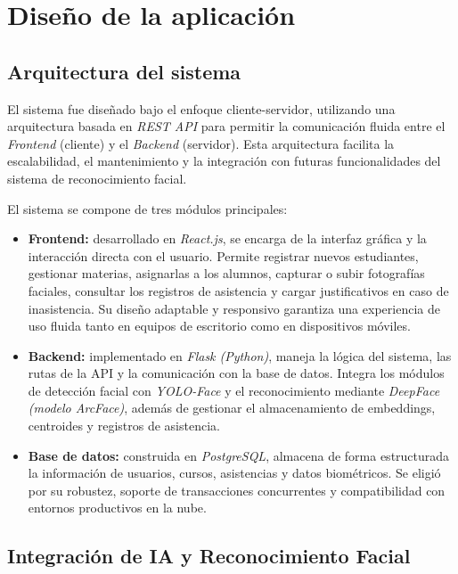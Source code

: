 \section{Diseño de la aplicación}
\subsection{Arquitectura del sistema}

El sistema fue diseñado bajo el enfoque cliente-servidor, utilizando una arquitectura basada en \textit{REST API} para permitir la comunicación fluida entre el \textit{Frontend} (cliente) y el \textit{Backend} (servidor).  
Esta arquitectura facilita la escalabilidad, el mantenimiento y la integración con futuras funcionalidades del sistema de reconocimiento facial.

El sistema se compone de tres módulos principales:

\begin{itemize}
    \item \textbf{Frontend:} desarrollado en \textit{React.js}, se encarga de la interfaz gráfica y la interacción directa con el usuario. Permite registrar nuevos estudiantes, gestionar materias, asignarlas a los alumnos, capturar o subir fotografías faciales, consultar los registros de asistencia y cargar justificativos en caso de inasistencia. Su diseño adaptable y responsivo garantiza una experiencia de uso fluida tanto en equipos de escritorio como en dispositivos móviles.

    \item \textbf{Backend:} implementado en \textit{Flask (Python)}, maneja la lógica del sistema, las rutas de la API y la comunicación con la base de datos. Integra los módulos de detección facial con \textit{YOLO-Face} y el reconocimiento mediante \textit{DeepFace (modelo ArcFace)}, además de gestionar el almacenamiento de embeddings, centroides y registros de asistencia.

    \item \textbf{Base de datos:} construida en \textit{PostgreSQL}, almacena de forma estructurada la información de usuarios, cursos, asistencias y datos biométricos. Se eligió por su robustez, soporte de transacciones concurrentes y compatibilidad con entornos productivos en la nube.
\end{itemize}
\subsection{Integración de IA y Reconocimiento Facial}


